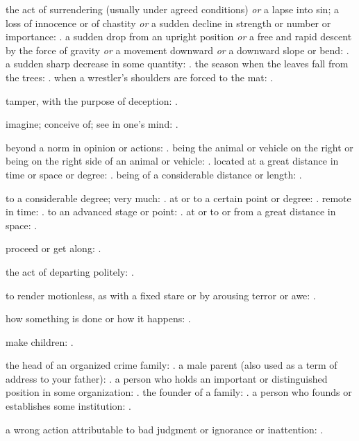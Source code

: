   the act of surrendering (usually under agreed conditions) \textit{or} a lapse into sin; a loss of innocence or of chastity \textit{or} a sudden decline in strength or number or importance: . a sudden drop from an upright position \textit{or} a free and rapid descent by the force of gravity \textit{or} a movement downward \textit{or} a downward slope or bend: . a sudden sharp decrease in some quantity: . the season when the leaves fall from the trees: . when a wrestler's shoulders are forced to the mat: .

  tamper, with the purpose of deception: .

  imagine; conceive of; see in one's mind: .

  beyond a norm in opinion or actions: . being the animal or vehicle on the right or being on the right side of an animal or vehicle: . located at a great distance in time or space or degree: . being of a considerable distance or length: .

  to a considerable degree; very much: . at or to a certain point or degree: . remote in time: . to an advanced stage or point: . at or to or from a great distance in space: .

  proceed or get along: .

  the act of departing politely: .

  to render motionless, as with a fixed stare or by arousing terror or awe: .

  how something is done or how it happens: .

  make children: .

  the head of an organized crime family: . a male parent (also used as a term of address to your father): . a person who holds an important or distinguished position in some organization: . the founder of a family: . a person who founds or establishes some institution: .

  a wrong action attributable to bad judgment or ignorance or inattention: .

